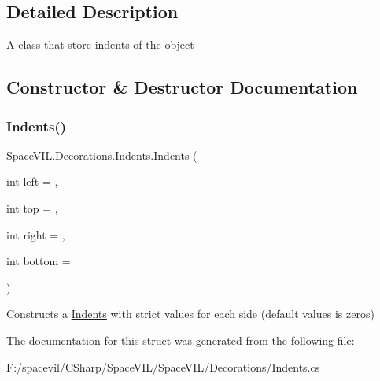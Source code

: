 \subsection{Detailed Description}
A class that store indents of the object 



\subsection{Constructor \& Destructor Documentation}
\mbox{\label{struct_space_v_i_l_1_1_decorations_1_1_indents_ab4ff2d499016f5ac819720f150cb09f1}} 
\subsubsection{\texorpdfstring{Indents()}{Indents()}}
{\footnotesize\ttfamily Space\+V\+I\+L.\+Decorations.\+Indents.\+Indents (\begin{DoxyParamCaption}\item[{int}]{left = {},  }\item[{int}]{top = {},  }\item[{int}]{right = {},  }\item[{int}]{bottom = {} }\end{DoxyParamCaption})\hspace{0.3cm}{\ttfamily [inline]}}



Constructs a \mbox{\hyperlink{struct_space_v_i_l_1_1_decorations_1_1_indents}{Indents}} with strict values for each side (default values is zeros) 



The documentation for this struct was generated from the following file\+:\begin{DoxyCompactItemize}
\item 
F\+:/spacevil/\+C\+Sharp/\+Space\+V\+I\+L/\+Space\+V\+I\+L/\+Decorations/Indents.\+cs\end{DoxyCompactItemize}
